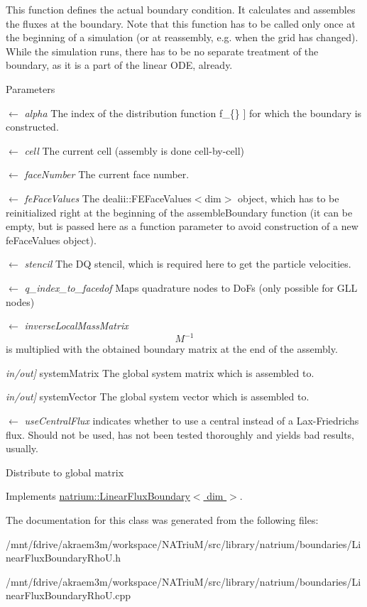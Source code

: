 This function defines the actual boundary condition. It calculates and assembles the fluxes at the boundary. Note that this function has to be called only once at the beginning of a simulation (or at reassembly, e.g. when the grid has changed). While the simulation runs, there has to be no separate treatment of the boundary, as it is a part of the linear ODE, already. 
\begin{DoxyParams}{Parameters}
\item[\mbox{$\leftarrow$} {\em alpha}]The index of the distribution function  f\_\-\{\} \mbox{]} for which the boundary is constructed. \item[\mbox{$\leftarrow$} {\em cell}]The current cell (assembly is done cell-\/by-\/cell) \item[\mbox{$\leftarrow$} {\em faceNumber}]The current face number. \item[\mbox{$\leftarrow$} {\em feFaceValues}]The dealii::FEFaceValues$<$dim$>$ object, which has to be reinitialized right at the beginning of the assembleBoundary function (it can be empty, but is passed here as a function parameter to avoid construction of a new feFaceValues object). \item[\mbox{$\leftarrow$} {\em stencil}]The DQ stencil, which is required here to get the particle velocities. \item[\mbox{$\leftarrow$} {\em q\_\-index\_\-to\_\-facedof}]Maps quadrature nodes to DoFs (only possible for GLL nodes) \item[\mbox{$\leftarrow$} {\em inverseLocalMassMatrix}]\[ M^{-1} \] is multiplied with the obtained boundary matrix at the end of the assembly. \item[{\em in/out\mbox{]}}]systemMatrix The global system matrix which is assembled to. \item[{\em in/out\mbox{]}}]systemVector The global system vector which is assembled to. \item[\mbox{$\leftarrow$} {\em useCentralFlux}]indicates whether to use a central instead of a Lax-\/Friedrichs flux. Should not be used, has not been tested thoroughly and yields bad results, usually. \end{DoxyParams}


Distribute to global matrix 

Implements \hyperlink{classnatrium_1_1LinearFluxBoundary_a0b050ff4bc9204ae732fec318c21cf2b}{natrium::LinearFluxBoundary$<$ dim $>$}.

The documentation for this class was generated from the following files:\begin{DoxyCompactItemize}
\item 
/mnt/fdrive/akraem3m/workspace/NATriuM/src/library/natrium/boundaries/LinearFluxBoundaryRhoU.h\item 
/mnt/fdrive/akraem3m/workspace/NATriuM/src/library/natrium/boundaries/LinearFluxBoundaryRhoU.cpp\end{DoxyCompactItemize}
